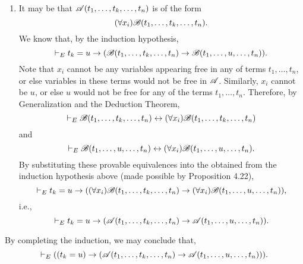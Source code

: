 \begin{enumerate}
\begin{enumerate}
      \item It may be that \(\mathscr{A}(t_1, \dots, t_k, \dots, t_n)\) is of the form
        \[(\forall x_i)\mathscr{B}(t_1, \dots, t_k, \dots, t_n).\]
        We know that, by the induction hypothesis,
        \[\vdash_{E} t_k = u \rightarrow (\mathscr{B}(t_1, \dots, t_k, \dots, t_n) \rightarrow \mathscr{B}(t_1, \dots, u, \dots, t_n)).\]
        Note that \(x_i\) cannot be any variables appearing free in any of terms \(t_1, \dots, t_n\), or else variables in these terms would not be free in \(\mathscr{A}\). Similarly, \(x_i\) cannot be \(u\), or else \(u\) would not be free for any of the terms \(t_1, \dots, t_n\). Therefore, by Generalization and the Deduction Theorem,
        \[\vdash_{E} \mathscr{B}(t_1, \dots, t_k, \dots, t_n) \leftrightarrow (\forall x_i)\mathscr{B}(t_1, \dots, t_k, \dots, t_n)\]
        and
        \[\vdash_{E} \mathscr{B}(t_1, \dots, u, \dots, t_n) \leftrightarrow (\forall x_i)\mathscr{B}(t_1, \dots, u, \dots, t_n).\]
        By substituting these provable equivalences into the \wf{} obtained from the induction hypothesis above (made possible by Proposition 4.22),
        \[\vdash_{E} t_k = u \rightarrow ((\forall x_i)\mathscr{B}(t_1, \dots, t_k, \dots, t_n) \rightarrow (\forall x_i)\mathscr{B}(t_1, \dots, u, \dots, t_n)),\]
        i.e.,
        \[\vdash_{E} t_k = u \rightarrow (\mathscr{A}(t_1, \dots, t_k, \dots, t_n) \rightarrow \mathscr{A}(t_1, \dots, u, \dots, t_n)).\]
    \end{enumerate}
    By completing the induction, we may conclude that,
    \[\vdash_{E} ((t_k = u) \rightarrow (\mathscr{A}(t_1, \dots, t_k, \dots, t_n) \rightarrow \mathscr{A}(t_1, \dots, u, \dots, t_n))).\]
\end{enumerate}

